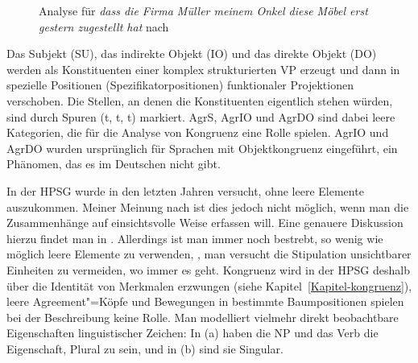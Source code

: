 \begin{figure}
\caption{\label{fig-konstituentenstellung-meinunger}Analyse für \emph{dass die Firma Müller meinem Onkel diese Möbel erst gestern zugestellt hat} 
nach }
\end{figure}
Das Subjekt (SU), das indirekte Objekt (IO) und das direkte Objekt (DO) werden als Konstituenten
einer komplex strukturierten VP erzeugt und dann in spezielle Positionen (Spezifikatorpositionen)
funktionaler Projektionen verschoben. Die Stellen, an denen die Konstituenten eigentlich stehen würden,
sind durch Spuren (t, t, t) markiert. AgrS, AgrIO und AgrDO sind dabei leere
Kategorien, die für die Analyse von Kongruenz eine Rolle spielen. AgrIO und
AgrDO wurden ursprünglich für Sprachen mit Objektkongruenz eingeführt, ein
Phänomen, das es im Deutschen nicht gibt.


In der HPSG wurde in den letzten Jahren versucht, ohne leere Elemente auszukommen. Meiner Meinung
nach ist dies jedoch nicht möglich, wenn man die Zusammenhänge auf einsichtsvolle Weise erfassen
will. Eine genauere Diskussion hierzu findet man in . Allerdings ist man immer
noch bestrebt, so wenig wie möglich leere Elemente zu verwenden, \dash, man versucht die Stipulation
unsichtbarer Einheiten zu vermeiden, wo immer es geht.
Kongruenz wird in der HPSG deshalb über die Identität von Merkmalen erzwungen (siehe
Kapitel~\ref{Kapitel-kongruenz}), leere Agreement"=Köpfe und Bewegungen in bestimmte Baumpositionen
spielen bei der Beschreibung keine Rolle.  Man modelliert vielmehr direkt beobachtbare Eigenschaften
linguistischer Zeichen: In (a) haben die NP und das Verb die Eigenschaft, Plural zu sein, und
in (b) sind sie Singular.

